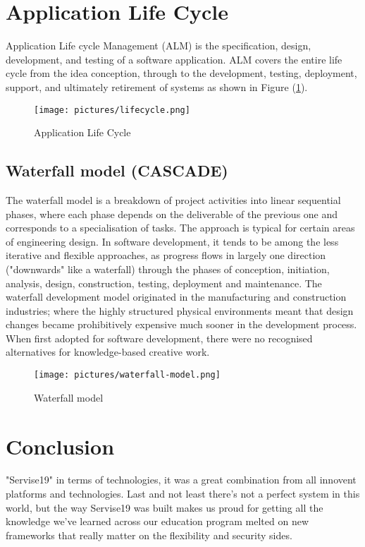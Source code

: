 \documentclass[12pt]{report}
\begin{document}
\section{Application Life Cycle}


Application Life cycle Management (ALM) is the specification, design, development, and testing of a software application. ALM covers the entire life cycle from the idea conception, through to the development, testing, deployment, support, and ultimately retirement of systems as shown in Figure (\ref{fig:applifecycle}).

\begin{figure}[!htbp]

        \centering
    \texttt{[image: pictures/lifecycle.png]}
    \caption{Application Life Cycle}
    \label{fig:applifecycle}
\end{figure}
\pagebreak
\subsection{Waterfall model (CASCADE)}
The waterfall model is a breakdown of project activities into linear sequential phases, where each phase depends on the deliverable of the previous one and corresponds to a specialisation of tasks. The approach is typical for certain areas of engineering design. In software development, it tends to be among the less iterative and flexible approaches, as progress flows in largely one direction ("downwards" like a waterfall) through the phases of conception, initiation, analysis, design, construction, testing, deployment and maintenance.
The waterfall development model originated in the manufacturing and construction industries; where the highly structured physical environments meant that design changes became prohibitively expensive much sooner in the development process. When first adopted for software development, there were no recognised alternatives for knowledge-based creative work.

\begin{figure}[!htbp]

        \centering
    \texttt{[image: pictures/waterfall-model.png]}
    \caption{Waterfall model}
    \label{fig:waterfallmodel}
\end{figure}
\pagebreak
\section*{Conclusion}
"Servise19" in terms of technologies, it was a great combination from all innovent platforms and technologies.
Last and not least there's not a perfect system in this world, but the way Servise19 was built makes us proud for getting all the knowledge we've learned across our education program melted on new frameworks that really matter on the flexibility and security sides.
\end{document}
